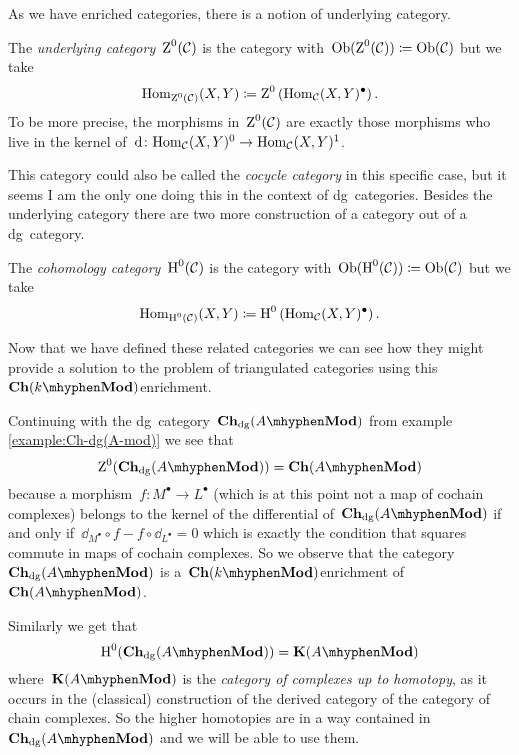 As we have enriched categories, there is a notion of underlying category.
\begin{definition}
  \label{definition:underlying-category}
  The \emph{underlying category}~$\operatorname{Z}^0(\mathcal{C})$ is the category with~$\mathrm{Ob}(\operatorname{Z}^0(\mathcal{C}))\coloneqq\mathrm{Ob}(\mathcal{C})$ but we take
  \begin{equation}
    \mathrm{Hom}_{\operatorname{Z}^0(\mathcal{C})}(X,Y)\coloneqq\operatorname{Z}^0\left( \mathrm{Hom}_{\mathcal{C}}(X,Y)^\bullet \right).
  \end{equation}
  To be more precise, the morphisms in~$\operatorname{Z}^0(\mathcal{C})$ are exactly those morphisms who live in the kernel of~$\mathrm{d}\colon\mathrm{Hom}_{\mathcal{C}}(X,Y)^0\to\mathrm{Hom}_{\mathcal{C}}(X,Y)^1$.
\end{definition}
This category could also be called the \emph{cocycle category} in this specific case, but it seems I am the only one doing this in the context of dg~categories. Besides the underlying category there are two more construction of a category out of a dg~category.
\begin{definition}
  \label{definition:homotopy-category}
  The \emph{cohomology category}~$\operatorname{H}^0(\mathcal{C})$ is the category with~$\mathrm{Ob}(\operatorname{H}^0(\mathcal{C}))\coloneqq\mathrm{Ob}(\mathcal{C})$ but we take
  \begin{equation}
    \mathrm{Hom}_{\operatorname{H}^0(\mathcal{C})}(X,Y)\coloneqq\operatorname{H}^0\left( \mathrm{Hom}_{\mathcal{C}}(X,Y)^\bullet \right).
  \end{equation}
\end{definition}

Now that we have defined these related categories we can see how they might provide a solution to the problem of triangulated categories using this~$\Ch(k\mhyphen\Mod)$\dash enrichment.
\begin{example}
  \label{example:Z0(Ch-dg(A-mod))}
  Continuing with the dg~category~$\Ch_\dg(A\mhyphen\Mod)$ from example \ref{example:Ch-dg(A-mod)} we see that
  \begin{equation}
    \ZZ^0(\Ch_\dg(A\mhyphen\Mod))=\Ch(A\mhyphen\Mod)
  \end{equation}
  because a morphism~$f\colon M^\bullet\to L^\bullet$ (which is at this point not a map of cochain complexes) belongs to the kernel of the differential of~$\Ch_\dg(A\mhyphen\Mod)$ if and only if~$\dd_{M^\bullet}\circ f-f\circ\dd_{L^\bullet}=0$ which is exactly the condition that squares commute in maps of cochain complexes. So we observe that the category~$\Ch_\dg(A\mhyphen\Mod)$ is a~$\Ch(k\mhyphen\Mod)$\dash enrichment of~$\Ch(A\mhyphen\Mod)$.
  
  Similarly we get that
  \begin{equation}
    \HH^0(\Ch_\dg(A\mhyphen\Mod))=\KKK(A\mhyphen\Mod) 
  \end{equation}
  where~$\KKK(A\mhyphen\Mod)$ is the \emph{category of complexes up to homotopy}, as it occurs in the (classical) construction of the derived category of the category of chain complexes. So the higher homotopies are in a way contained in~$\Ch_\dg(A\mhyphen\Mod)$ and we will be able to use them.
\end{example}

